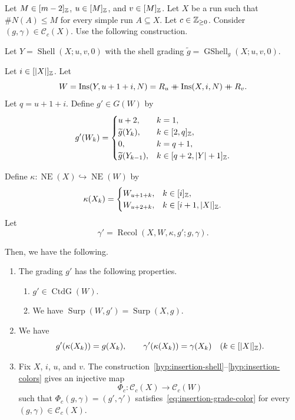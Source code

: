 \begin{lemma}[Insertion]\label{lem:vertical-insert}
Let $M\in[m-2]_{\mathbb Z}$, $u\in[M]_{\mathbb Z}$, and $v\in[M]_{\mathbb Z}$.
Let $X$ be a run such that $\#N(A)\le M$ for every simple run $A\subseteq X$.
Let $c\in\mathbb Z_{\ge0}$.
Consider $(g,\gamma)\in\mathcal C_c(X)$.
Use the following construction.
\begin{hypotheses}
\item\label{hyp:insertion-shell} Let $Y=\operatorname{Shell}(X;u,v,0)$ with the shell grading $\widetilde g=\operatorname{GShell}_{g}(X;u,v,0)$.
\item\label{hyp:insertion-operation} Let $i\in[|X|]_{\mathbb Z}$.
Let
\[
 W=\operatorname{Ins}(Y,u+1+i,N)=R_u\mathbin{+\mkern-10mu+}\operatorname{Ins}(X,i,N)\mathbin{+\mkern-10mu+} R_v.
\]
Let $q=u+1+i$. Define $g'\in G(W)$ by
\[
 g'(W_k)=\begin{cases}
 u+2,&k=1,\\
 \widetilde g(Y_k),&k\in[2,q]_{\mathbb Z},\\
 0,&k=q+1,\\
 \widetilde g(Y_{k-1}),&k\in[q+2,|Y|+1]_{\mathbb Z}.
 \end{cases}
\]
\item\label{hyp:insertion-colors} Define
$\kappa\colon\operatorname{NE}(X)\hookrightarrow\operatorname{NE}(W)$ by
\begin{equation}\label{eq:insertion-edge-map}
 \kappa(X_k)=
 \begin{cases}
 W_{u+1+k},&k\in[i]_{\mathbb Z},\\
 W_{u+2+k},&k\in[i+1,|X|]_{\mathbb Z}.
 \end{cases}
\end{equation}
Let
\[
 \gamma'=\operatorname{Recol}(X,W,\kappa,g';g,\gamma).
\]
\end{hypotheses}
Then, we have the following.

\begin{enumerate}
\item\label{c:vertical-insert-connected} The grading $g'$ has the following properties.
\begin{enumerate}[label=(\alph*),ref=\theenumi(\alph*)]
\item\label{c:vertical-insert-connectivity} $g'\in\operatorname{CtdG}(W)$.
\item\label{c:vertical-insert-residual} We have
$\operatorname{Surp}(W,g')=\operatorname{Surp}(X,g)$.
\end{enumerate}
\item\label{c:vertical-insert-preserved} We have
\begin{equation}\label{eq:insertion-grade-color}
 g'(\kappa(X_k))=g(X_k),\qquad
 \gamma'(\kappa(X_k))=\gamma(X_k)
 \quad(k\in[|X|]_{\mathbb Z}).
\end{equation}
\item\label{c:vertical-insert-injective} Fix $X$, $i$, $u$, and $v$.
The construction~\ref{hyp:insertion-shell}--\ref{hyp:insertion-colors} gives an injective map
\[
 \Phi_c\colon\mathcal C_c(X)\longrightarrow\mathcal C_c(W)
\]
such that $\Phi_c(g,\gamma)=(g',\gamma')$ satisfies~\eqref{eq:insertion-grade-color}
for every $(g,\gamma)\in\mathcal C_c(X)$.
\end{enumerate}
\end{lemma}
